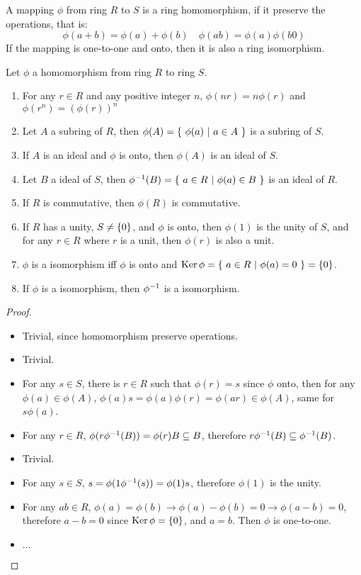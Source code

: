 \documentclass[../main.tex]{subfiles}
\begin{document}
\begin{definition}
  A mapping $\phi$ from ring $R$ to $S$ is a ring homomorphism, if it preserve 
  the operations, that is:
  \[
    \phi(a + b) = \phi(a) + \phi(b) \quad \phi(ab) = \phi(a)\phi(b0)
  \]
  If the mapping is one-to-one and onto, then it is also a ring isomorphism.
\end{definition}

\begin{theorem}
  Let $\phi$ a homomorphism from ring $R$ to ring $S$.
  \begin{enumerate}
    \item For any $r \in R$ and any positive integer $n$, 
          $\phi(nr) = n\phi(r)$ and $\phi(r^n) = (\phi(r))^n$
    \item Let $A$ a subring of $R$, then $\phi(A) = \{ \ \phi(a) \ | \ a \in A \ \}$
          is a subring of $S$.
    \item If $A$ is an ideal and $\phi$ is onto, then $\phi(A)$ is an ideal of $S$.
    \item Let $B$ a ideal of $S$, then $\phi^{-1}(B) = \{ \ a \in R \ | \ \phi(a) \in B \ \}$
          is an ideal of $R$.
    \item If $R$ is commutative, then $\phi(R)$ is commutative.
    \item If $R$ has a unity, $S \neq \{0\}$, and $\phi$ is onto, 
          then $\phi(1)$ is the unity of $S$, and for any $r \in R$ 
          where $r$ is a unit, then $\phi(r)$ is also a unit.
    \item $\phi$ is a isomorphism iff $\phi$ is onto and $\operatorname{Ker} \phi = \{ \ a \in R \ | \ \phi(a) = 0 \ \} = \{0\}$.
    \item If $\phi$ is a isomorphism, then $\phi^{-1}$ is a isomorphism.
  \end{enumerate}
\end{theorem}
\begin{proof}
  ~
  \begin{itemize}
    \item Trivial, since homomorphism preserve operations.
    \item Trivial.
    \item For any $s \in S$, there is $r \in R$ such that $\phi(r) = s$ since $\phi$ onto,
          then for any $\phi(a) \in \phi(A)$, $\phi(a)s = \phi(a)\phi(r) = \phi(ar) \in \phi(A)$,
          same for $s\phi(a)$.
    \item For any $r \in R$, $\phi(r\phi^{-1}(B)) = \phi(r) B \subseteq B$, therefore
          $r\phi^{-1}(B) \subseteq \phi^{-1}(B)$.
    \item Trivial.
    \item For any $s \in S$, $s = \phi(1 \phi^{-1}(s)) = \phi(1)s$, therefore $\phi(1)$ is the unity.
    \item For any $a b \in R$, $\phi(a) = \phi(b) \rightarrow \phi(a) - \phi(b) = 0 \rightarrow \phi(a - b) = 0$,
          therefore $a - b = 0$ since $\operatorname{Ker} \phi = \{0\}$, and $a = b$. Then $\phi$ is one-to-one.
    \item $\dots$
  \end{itemize}
\end{proof}
\end{document}
